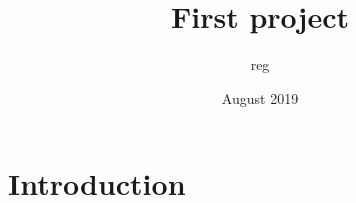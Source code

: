 \documentclass{article}
\title{First project}
\author{reg }
\date{August 2019}
\begin{document}
\maketitle

\section{Introduction}

\subsection{}
\end{document}
